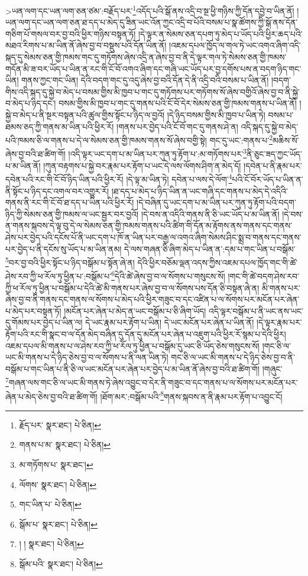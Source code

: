  >ཡན་ལག་དང་ཡན་ལག་ཅན་ཙམ་:བརྗོད་པར་\footnote{རྗོད་པར་  སྣར་ཐང་།  པེ་ཅིན། }འདོད་པའི་སྒོ་ནས་འདྲི་བ་སྔ་ཕྱི་གཉིས་ཀྱི་དོན་དབྱེ་བ་ཡིན་ནོ། །ཡན་ལག་དང་ཡན་ལག་ཅན་ཐ་དད་པ་མེད་དུ་ཟིན་ཡང་འོན་ཀྱང་འདྲི་བ་པོའི་བསམ་པ་སྣ་ཚོགས་ཀྱི་སྒོ་ནས་དོན་གཅིག་པོ་གསལ་བར་བྱ་བའི་ཕྱིར་གཉིས་བསྟན་ཏོ། །དེ་ལྟར་ན་སེམས་ཅན་དཔག་ཏུ་མེད་པ་ཡོད་པའི་ཕྱིར་ཆད་པའི་མཐའ་རིགས་པ་མ་ཡིན་ནོ་ཞེས་བྱ་བ་བསྡུས་པའི་དོན་ཡིན་ནོ། །འཇམ་དཔལ་ཁྱོད་ལ་གལ་ཏེ་ཡང་འགའ་ཞིག་འདི་སྐད་དུ་སེམས་ཅན་གྱི་ཁམས་གང་དུ་གཏོགས་ཞེས་འདྲི་ན་ཞེས་བྱ་བ་ནི་དེ་ལྟར་གལ་ཏེ་སེམས་ཅན་གྱི་ཁམས་གདོན་མི་ཟ་བར་ཡོད་པ་ཡིན་ན་རང་གི་ངོ་བོ་འགའ་ཞིག་དང་གཞི་ཡང་ཡོད་པར་བྱ་དགོས་པས་ན་བདག་ཉིད་གང་ཡིན། གནས་ཀྱང་གང་ཡིན། དེའི་བདག་གང་དུ་འདུ་ཞེས་བྱ་བའི་དོན་དེ་ནི་འདྲི་བའི་བསམ་པ་ཡིན་ནོ། །བདག་གིས་འདི་སྐད་དུ་སྐྱེ་བ་མེད་པ་བསམ་གྱིས་མི་ཁྱབ་པ་གང་དུ་གཏོགས་པར་གཏོགས་སོ་ཞེས་བགྱིའོ་ཞེས་བྱ་བ་ནི་སྐྱེ་བ་མེད་པ་ཉིད་དང་། བསམ་གྱིས་མི་ཁྱབ་པ་གང་དུ་གནས་པའི་ངོ་བོ་དེར་སེམས་ཅན་གྱི་ཁམས་གནས་པ་ཡིན་ནོ། །སྐྱེ་བ་མེད་པ་ནི་སྔར་བསྟན་པའི་ཚུལ་གྱིས་སྟོང་པ་ཉིད་ལ་བྱའོ། །དེ་ཉིད་བསམ་གྱིས་མི་ཁྱབ་པ་ཡིན་ཏེ། བསམ་པ་ཐམས་ཅད་ཀྱི་གནས་མ་ཡིན་པའི་ཕྱིར་རོ། །གནས་པར་བྱེད་པའི་ངོ་བོ་གང་དུ་གནས་ཤེ་ན། འདི་སྐད་དུ་སྐྱེ་བ་མེད་པའི་ཁམས་ཅི་ལ་གནས་པ་དེ་ལ་སེམས་ཅན་གྱི་ཁམས་གནས་སོ་ཞེས་བགྱི་སྟེ། གང་དུ་ཡང་:གནས་པ་\footnote{གནས་པ་མ་  སྣར་ཐང་།  པེ་ཅིན། }མཆིས་སོ་ཞེས་བྱ་བའི་ཐ་ཚིག་གོ། །འདི་ལྟར་ཡང་དག་པ་མ་ཡིན་པར་ཀུན་ཏུ་རྟོག་པ་:མ་གཏོགས་པར་\footnote{མ་གཏོགས་པ་  སྣར་ཐང་། }ནི་ཅུང་ཟད་ཀྱང་ཡོད་པ་མ་ཡིན་ནོ། །ཀུན་བརྟགས་པ་སྐྱེ་བར་རྣམ་པར་རྟོག་པ་ཡང་དེ་ལས་ལོགས་ཤིག་ན་མེད་དོ། །དབེན་པ་ནི་རྣམ་པར་དབེན་པའི་རང་གི་ངོ་བོ་ཉིད་ཡིན་པའི་ཕྱིར་རོ། །དེ་ལྟ་མ་ཡིན་ཏེ། དབེན་པ་ལས་དེ་ལོག་\footnote{ལོགས་  སྣར་ཐང་།  པེ་ཅིན། }པའི་ངོ་བོར་ཡོད་པ་ཡིན་ན་ནི་སྟོང་པ་ཉིད་དང་འགལ་བར་འགྱུར་རོ། །ཐ་དད་པ་མེད་པ་ཉིད་ཡིན་ན་ཡང་གཞི་དང་གནས་པ་མེད་དེ་འདིའི་གནས་ནི་རང་གི་ངོ་བོ་ཐ་དད་པ་ཡིན་པའི་ཕྱིར་རོ། །དེ་བཞིན་དུ་ཡང་དག་པ་མ་ཡིན་པར་ཀུན་ཏུ་རྟོག་པའི་བདག་ཉིད་ཀྱི་སེམས་ཅན་གྱི་ཁམས་ལ་ཡང་སྦྱར་བར་བྱའོ། །དེ་བས་ན་འདིའི་གནས་ནི་ཅི་ཡང་ཡོད་པ་མ་ཡིན་ནོ། །དེ་བས་ན་གནས་སྐབས་དེ་ལྟ་བུ་དེ་ལ་སེམས་ཅན་གྱི་ཁམས་གནས་པའི་ཚིག་གི་དོན་མ་རྟོགས་ནས་གནས་དང་གནས་ཤེས་པར་བྱེད་པའི་དངོས་པོ་ནི་ཡང་དག་པ་ཁོ་ན་ཡིན་པར་བརྒྱ་ལ་འགའ་ཞིག་སེམས་ཤིང་སྨྲ་བ་གནས་དང་གནས་པར་བྱེད་པ་ནི་དངོས་སུ་ཡོད་པ་མ་ཡིན་ནམ། དེ་ལས་གཞན་ཅི་ཞིག་མེད་པ་ཡིན་ན་:དམ་པ་གང་ཡིན་པ་བསྒོམ་\footnote{གང་ཡིན་པ་  པེ་ཅིན། }བར་བྱ་བའི་ཕྱིར་སྟོང་པ་ཉིད་བསྒོམ་པ་སྟོན་ཞེ་ན། དེའི་ཕྱིར་བཅོམ་ལྡན་འདས་ཀྱིས་འཇམ་དཔལ་ཁྱོད་གང་གི་ཚེ་ཤེས་རབ་ཀྱི་ཕ་རོལ་ཏུ་ཕྱིན་པ་:བསྒོམ་པ་\footnote{སྒོམ་པ་  སྣར་ཐང་།  པེ་ཅིན། }དེའི་ཚེ་ཞེས་བྱ་བ་ལ་སོགས་པ་གསུངས་སོ། །གང་གི་ཚེ་བདག་ཤེས་རབ་ཀྱི་ཕ་རོལ་ཏུ་ཕྱིན་པ་བསྒོམ་པ་དེའི་ཚེ་མི་གནས་པར་ཞེས་བྱ་བ་ལ་སོགས་པས་དོན་ཅི་བསྟན་ཞེ་ན། མི་གནས་པར་ཞེས་བྱ་བ་ནི་གནས་དང་གནས་ལ་སོགས་པ་མེད་པའི་ཕྱིར་གཟུང་བ་དང་འཛིན་པ་ལ་སོགས་པར་མངོན་པར་ཞེན་པ་མེད་པར་བསྟན་ཏོ། །མངོན་པར་ཞེན་པ་མེད་ན་ཡང་བསྒོམ་པ་ཅི་ཞིག་ཡོད། འདི་ལྟར་བསྒོམ་པ་ནི་ཡང་ནས་ཡང་དུ་གོམས་པར་བྱེད་པ་ཡིན་ལ། དེ་ཡང་རྣམ་པར་རྟོག་པ་ཡིན། དེ་ཡང་མངོན་པར་ཞེན་པ་ཡིན་ནོ། །དེ་ལྟར་རྣམ་པར་རྟོག་པའི་རང་གི་སྣང་བ་ལ་དོན་མེད་བཞིན་དུ་དོན་དུ་མངོན་པར་ཞེན་པ་འཇུག་པའི་ཕྱིར་རོ་སྙམ་པ་དེའི་ཕྱིར། འཇམ་དཔལ་མི་གནས་པ་ལ་ཤེས་རབ་ཀྱི་ཕ་རོལ་ཏུ་ཕྱིན་པ་བསྒོམ་དུ་ཡང་ཅི་ཡོད་ཅེས་གསུངས་སོ། །གང་ཅི་ལ་ཡང་མི་གནས་པ་དེ་ཉིད་ཅེས་བྱ་བ་ལ་སོགས་པ་ནི་ལན་ཡིན་ཏེ། གང་ཅི་ལ་ཡང་མི་གནས་པ་དེ་ཉིད་ཅེས་བྱ་བ་ནི་བསྒོམ་པ་གང་ཡིན་པ་ནི་ཅི་ལ་ཡང་མངོན་པར་ཞེན་པར་བྱེད་པ་མ་ཡིན་ནོ་ཞེས་བྱ་བའི་ཐ་ཚིག་གོ། །གཞུང་\footnote{། །  སྣར་ཐང་།  པེ་ཅིན། }གཞན་ལས་གང་ཅི་ལ་ཡང་མི་གནས་ཏེ་ཞེས་འབྱུང་བ་དེར་ནི་གཟུང་བ་དང་གནས་པ་ལ་སོགས་པར་མངོན་པར་ཞེན་པ་མེད་ཅེས་བྱ་བའི་ཐ་ཚིག་གོ། །ཐོག་མར་:བསྒོམ་པའི་\footnote{སྒོམ་པའི་  སྣར་ཐང་།  པེ་ཅིན། }གནས་སྐབས་ན་ནི་རྣམ་པར་རྟོག་པ་འབྱུང་ངོ། 